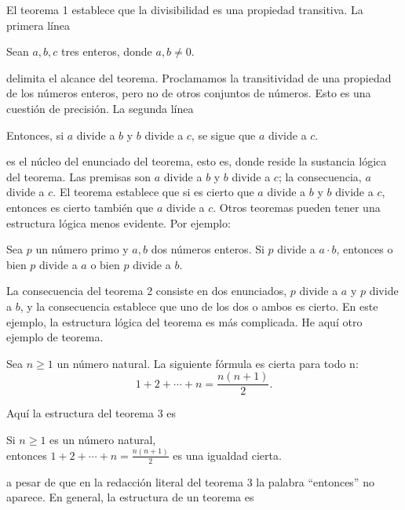 El teorema 1 establece que la divisibilidad es una propiedad transitiva.
La primera línea
\begin{center}
    Sean $a,b,c$ tres enteros, donde $a,b \neq 0$.
\end{center}
delimita el alcance del teorema.
Proclamamos la transitividad de una propiedad de los números enteros, pero no de otros conjuntos de números.
Esto es una cuestión de precisión.
La segunda línea
\begin{center}
    Entonces, si $a$ divide a $b$ y $b$ divide a $c$, se sigue que $a$ divide a $c$.
\end{center}
es el núcleo del enunciado del teorema, esto es, donde reside la sustancia lógica del teorema.
Las premisas son $a$ divide a $b$ y $b$ divide a $c$; la consecuencia, $a$ divide a $c$.
El teorema establece que si es cierto que $a$ divide a $b$ y $b$ divide a $c$, entonces es cierto también que $a$ divide a $c$.
Otros teoremas pueden tener una estructura lógica menos evidente.
Por ejemplo:
\begin{theorem}
    Sea $p$ un número primo y $a,b$ dos números enteros.
    Si $p$ divide a $a\cdot b$, entonces o bien $p$ divide a $a$ o bien $p$ divide a $b$.
\end{theorem}
La consecuencia del teorema 2 consiste en dos enunciados, $p$ divide a $a$ y $p$ divide a $b$, y la consecuencia establece que uno de los dos o ambos es cierto.
En este ejemplo, la estructura lógica del teorema es más complicada.
He aquí otro ejemplo de teorema.
\begin{theorem}
    Sea $n \geq 1$ un número natural.
    La siguiente fórmula es cierta para todo n:
    \[
        1 + 2 + \cdots + n = \frac{n(n + 1)}{2}.
    \]
\end{theorem}
Aquí la estructura del teorema 3 es
\begin{center}
    Si $n\geq 1$ es un número natural,\\ entonces $1 + 2 + \cdots + n = \frac{n(n + 1)}{2}$ es una igualdad cierta.
\end{center}
a pesar de que en la redacción literal del teorema 3 la palabra “entonces” no aparece.
En general, la estructura de un teorema es